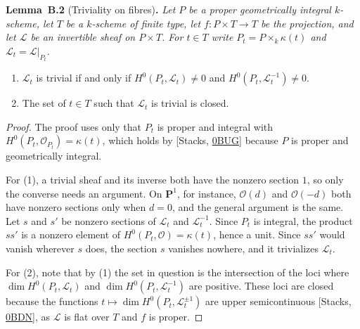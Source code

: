 \documentclass[11pt]{article}
\newenvironment{bpstatement}[2]{\par\addvspace{0.6\baselineskip}\noindent\textbf{#1}#2\textbf{.}\enspace\ignorespaces}
  {\par\addvspace{0.4\baselineskip}}
\newenvironment{bpstatementit}[2]{\begin{bpstatement}{#1}{#2}\itshape\ignorespaces}{\end{bpstatement}}
\begin{document}
\label{bp80}%
\begin{bpstatementit}{Lemma~B.2}{ (Triviality on fibres)}
Let \(P\) be a proper geometrically integral \(k\)-scheme, let \(T\) be a \(k\)-scheme of finite type, let \(f:P\times T\to T\) be the projection, and let \(\mathcal L\) be an invertible sheaf on \(P\times T\). For \(t\in T\) write \(P_t=P\times_k\kappa(t)\) and \(\mathcal L_t=\mathcal L|_{P_t}\).

\begin{enumerate}
\item \(\mathcal L_t\) is trivial if and only if \(H^0(P_t,\mathcal L_t)\ne0\) and \(H^0(P_t,\mathcal L_t^{-1})\ne0\).
\item The set of \(t\in T\) such that \(\mathcal L_t\) is trivial is closed.
\end{enumerate}
\end{bpstatementit}

\begin{proof}[{Proof}]\label{bp81}%
The proof uses only that \(P_t\) is proper and integral with \(H^0(P_t,\mathcal O_{P_t})=\kappa(t)\), which holds by [Stacks, \href{https://stacks.math.columbia.edu/tag/0BUG}{0BUG}] because \(P\) is proper and geometrically integral.

For (1), a trivial sheaf and its inverse both have the nonzero section \(1\), so only the converse needs an argument. On \(\mathbf P^1\), for instance, \(\mathcal O(d)\) and \(\mathcal O(-d)\) both have nonzero sections only when \(d=0\), and the general argument is the same. Let \(s\) and \(s'\) be nonzero sections of \(\mathcal L_t\) and \(\mathcal L_t^{-1}\). Since \(P_t\) is integral, the product \(ss'\) is a nonzero element of \(H^0(P_t,\mathcal O)=\kappa(t)\), hence a unit. Since \(ss'\) would vanish wherever \(s\) does, the section \(s\) vanishes nowhere, and it trivializes \(\mathcal L_t\).

For (2), note that by (1) the set in question is the intersection of the loci where \(\dim H^0(P_t,\mathcal L_t)\) and \(\dim H^0(P_t,\mathcal L_t^{-1})\) are positive. These loci are closed because the functions \(t\mapsto\dim H^0(P_t,\mathcal L_t^{\pm1})\) are upper semicontinuous [Stacks, \href{https://stacks.math.columbia.edu/tag/0BDN}{0BDN}], as \(\mathcal L\) is flat over \(T\) and \(f\) is proper.
\end{proof}
\end{document}
